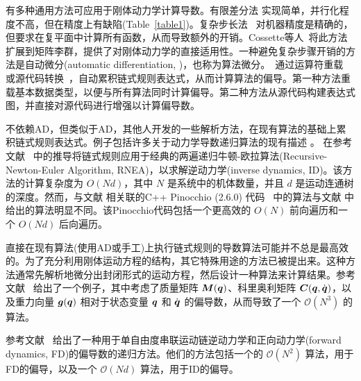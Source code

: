 \documentclass[letterpaper, 10 pt, conference]{ieeetran}  %
\begin{document}
有多种通用方法可应用于刚体动力学计算导数。有限差分法 \cite{tassa,koena,mujoco}实现简单，并行化程度不高，但在精度上有缺陷(Table~\ref{table1})。复杂步长法~\cite{cstep} 
对机器精度是精确的，但要求在复平面中计算所有函数，从而导致额外的开销。Cossette等人~\cite{complex}将此方法扩展到矩阵李群，提供了对刚体动力学的直接适用性。一种避免复杂步骤开销的方法是自动微分(automatic differentiation, \autodiff)，也称为算法微分\cite{Kudruss,robcogen,drake}。\autodiff~通过运算符重载~\cite{Kudruss} 或源代码转换~\cite{drake,robcogen}，自动累积链式规则表达式，从而计算算法的偏导。第一种方法重载基本数据类型，以便与所有算法同时计算偏导。第二种方法从源代码构建表达式图，并直接对源代码进行增强以计算偏导数。


不依赖AD，但类似于AD，其他人开发的一些解析方法，在现有算法的基础上累积链式规则表达式。例子包括许多关于动力学导数递归算法的现有描述 \cite{sohl2001recursive,car,lee2005newton}。
在参考文献~\cite{car} 中的推导将链式规则应用于经典的两遍递归牛顿-欧拉算法(Recursive-Newton-Euler Algorithm, RNEA)，以求解逆动力学(inverse dynamics, ID)。该方法的计算复杂度为 $O(Nd)$，其中 $N$ 是系统中的机体数量，并且 $d$ 是运动连通树的深度。然而，与文献 \cite{car} 相关联的C++ Pinocchio (2.6.0) 代码~\cite{car_code} 中的算法与文献 \cite{car} 中给出的算法明显不同。该Pinocchio代码包括一个更高效的 $O(N)$ 前向遍历和一个 $O(Nd)$ 后向遍历。

直接在现有算法(使用AD或手工)上执行链式规则的导数算法可能并不总是最高效的。为了充分利用刚体运动方程的结构，其它特殊用途的方法已被提出来。这种方法通常先解析地微分出封闭形式的运动方程，然后设计一种算法来计算结果。参考文献~\cite{garofalo} 给出了一个例子，其中考虑了质量矩阵 $\boldsymbol{M}(\boldsymbol{q})$、科里奥利矩阵 $\boldsymbol{C}(\boldsymbol{q},\dot{\boldsymbol{q}})$，以及重力向量 $\boldsymbol{g}(\boldsymbol{q})$ 相对于状态变量 $\boldsymbol{q}$ 和 $\dot{\boldsymbol{q}}$ 的偏导数，从而导致了一个 $\mathcal{O}(N^3)$ 的算法。

参考文献~\cite{jain} 给出了一种用于单自由度串联运动链逆动力学和正向动力学(forward dynamics, FD)的偏导数的递归方法。他们的方法包括一个的 $\mathcal{O}(N^2)$ 算法，用于FD的偏导，以及一个 $\mathcal{O}(Nd)$ 算法，用于ID的偏导。
\end{document}
